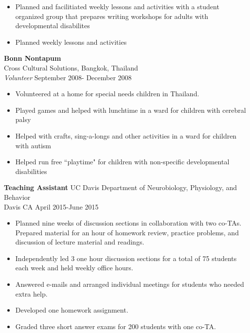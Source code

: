 \documentclass[line,margin,10pt]{res}
\begin{document}
\begin{resume}
        \begin{itemize}  \itemsep -2pt %
     \item Planned and facilitiated weekly lessons and activities with a student organized group that prepares writing workshops for adults with developmental disabilites
\item Planned weekly lessons and activities
  \end{itemize} 
                 
     \textbf{Bonn Nontapum }\\
Cross Cultural Solutions, Bangkok, Thailand\\
{\sl Volunteer} \hfill        September 2008- December 2008
                
\begin{itemize}
\item Volunteered at a home for special needs children in Thailand.
\item Played games and helped with lunchtime in a ward for children with cerebral palsy
\item Helped with crafts, sing-a-longs and other activities in a ward for children with autism
\item Helped run free ``playtime" for children with non-specific developmental disabilities
\end{itemize} 
 
\textbf{Teaching Assistant} \hfill UC Davis Department of Neurobiology, Physiology, and Behavior\\ 
Davis CA \hfill April 2015-June 2015
\begin{itemize}\itemsep -2pt
\item Planned nine weeks of discussion sections in collaboration with two co-TAs. Prepared material for an hour of homework review, practice problems, and discussion of lecture material and readings.
\item Independently led 3 one hour discussion sections for a total of 75 students each week and held weekly office hours.
 \item Answered e-mails and arranged individual meetings for students who needed extra help.
\item Developed one homework assignment.
\item Graded three short answer exams for 200 students with one co-TA.
\end{itemize}
 

\end{resume}
\end{document}
